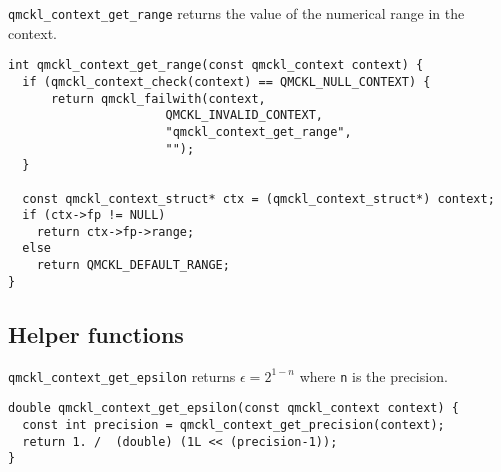 \texttt{qmckl\_context\_get\_range} returns the value of the numerical range in the context.

\begin{verbatim}
int qmckl_context_get_range(const qmckl_context context) {
  if (qmckl_context_check(context) == QMCKL_NULL_CONTEXT) {
      return qmckl_failwith(context,
                      QMCKL_INVALID_CONTEXT,
                      "qmckl_context_get_range",
                      "");
  }

  const qmckl_context_struct* ctx = (qmckl_context_struct*) context;
  if (ctx->fp != NULL) 
    return ctx->fp->range;
  else
    return QMCKL_DEFAULT_RANGE;
}
\end{verbatim}
\subsection{Helper functions}
\label{sec:org953484b}

\texttt{qmckl\_context\_get\_epsilon} returns \(\epsilon = 2^{1-n}\) where \texttt{n} is the precision.

\begin{verbatim}
double qmckl_context_get_epsilon(const qmckl_context context) {
  const int precision = qmckl_context_get_precision(context);
  return 1. /  (double) (1L << (precision-1));
}
\end{verbatim}
